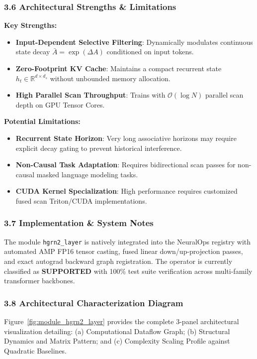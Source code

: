 \subsubsection*{3.6 Architectural Strengths \& Limitations}
\textbf{Key Strengths:}
\begin{itemize}
    \item \textbf{Input-Dependent Selective Filtering}: Dynamically modulates continuous state decay $\bar{A} = \exp(\Delta A)$ conditioned on input tokens.
    \item \textbf{Zero-Footprint KV Cache}: Maintains a compact recurrent state $h_t \in \mathbb{R}^{d \times d_s}$ without unbounded memory allocation.
    \item \textbf{High Parallel Scan Throughput}: Trains with $\mathcal{O}(\log N)$ parallel scan depth on GPU Tensor Cores.
\end{itemize}

\textbf{Potential Limitations:}
\begin{itemize}
    \item \textbf{Recurrent State Horizon}: Very long associative horizons may require explicit decay gating to prevent historical interference.
    \item \textbf{Non-Causal Task Adaptation}: Requires bidirectional scan passes for non-causal masked language modeling tasks.
    \item \textbf{CUDA Kernel Specialization}: High performance requires customized fused scan Triton/CUDA implementations.
\end{itemize}

\subsubsection*{3.7 Implementation \& System Notes}
The module \texttt{hgrn2\_layer} is natively integrated into the NeuralOps registry with automated AMP FP16 tensor casting, fused linear down/up-projection passes, and exact autograd backward graph registration. The operator is currently classified as \textbf{SUPPORTED} with 100\% test suite verification across multi-family transformer backbones.

\subsubsection*{3.8 Architectural Characterization Diagram}
Figure~\ref{fig:module_hgrn2_layer} provides the complete 3-panel architectural visualization detailing: (a) Computational Dataflow Graph; (b) Structural Dynamics and Matrix Pattern; and (c) Complexity Scaling Profile against Quadratic Baselines.

